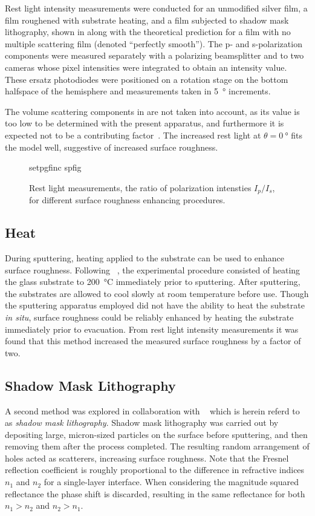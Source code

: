 Rest light intensity measurements were conducted for an unmodified silver
film, a film roughened with substrate heating, and a film subjected to
shadow mask lithography, shown in  along with the
theoretical prediction for a film with no multiple scattering film (denoted
``perfectly smooth'').  The p- and s-polarization components were measured
separately with a polarizing beamsplitter and to two cameras whose pixel
intensities were integrated to obtain an intensity value.  These ersatz
photodiodes were positioned on a rotation stage on the bottom halfspace of
the hemisphere and measurements taken in \SI{5}{\degree} increments.

The volume scattering components in  are not taken
into account, as its value is too low to be determined with the present
apparatus, and furthermore it is expected not to be a contributing
factor~\cite{kretschmann1972decay}.  The increased rest light at
$\theta=\SI{0}{\degree}$ fits the model well, suggestive of increased
surface roughness.
\begin{figure}[ht]
 \centering
 {setpgfinc}
 {spfig}
 \caption{Rest light measurements, the ratio of polarization intensties
									$I_p/I_s$,  for different surface roughness enhancing procedures.}
 \label{fig:spratio}
\end{figure}

\subsection{Heat}
During sputtering, heating applied to the substrate can be used to enhance
surface roughness.  Following
~\cite{horstmann1977multiple}, the experimental procedure
consisted of heating the glass substrate to \SI{200}{\celsius} immediately
prior to sputtering.  After sputtering, the substrates are allowed to cool
slowly at room temperature before use.  Though the sputtering apparatus
employed did not have the ability to heat the substrate \textit{in situ},
surface roughness could be reliably enhanced by heating the substrate
immediately prior to evacuation.  From rest light intensity measurements it
was found that this method increased the measured surface roughness by a
factor of two.

\subsection{Shadow Mask Lithography}
A second method was explored in collaboration with
~\cite{huang2014speckle} which is herein referd to as
\textit{shadow mask lithography}.  Shadow mask lithography was carried out
by depositing large, micron-sized particles on the surface before
sputtering, and then removing them after the process completed.  The
resulting random arrangement of holes acted as scatterers, increasing
surface roughness.  Note that the Fresnel reflection coefficient is roughly
proportional to the difference in refractive indices $n_1$ and $n_2$ for a
single-layer interface.  When considering the magnitude squared reflectance
the phase shift is discarded, resulting in the same reflectance for both
$n_1>n_2$ and $n_2>n_1$.

